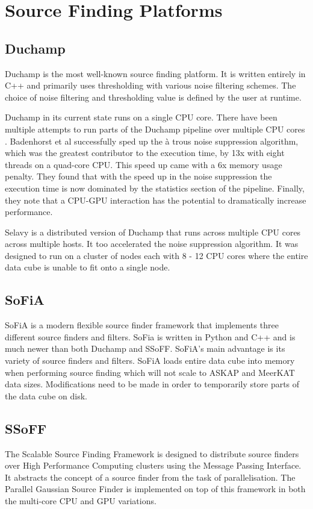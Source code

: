 \documentclass[prodmode,acmtecs]{acmsmall} \usepackage[ruled]{algorithm2e}
\begin{document}
\section{Source Finding Platforms}
    \subsection{Duchamp}
Duchamp is the most well-known source finding platform. It is written entirely in C++ and primarily uses
thresholding with various noise filtering schemes. The choice of noise filtering and thresholding
value is defined by the user at runtime.  
        \cite{whiting2012duchamp}

Duchamp in its current state runs on a single CPU core. There have been multiple attempts to run
parts of the Duchamp pipeline over multiple CPU cores \cite{scott} \cite{whiting2012source}. Badenhorst et al 
 successfully sped up the \`{a} trous noise suppression algorithm, which was the greatest contributor to the 
execution time, by 13x with eight threads on a quad-core CPU.
This speed up came with a 6x memory usage penalty. They found that with the speed up in the noise
suppression the execution time is now dominated by the statistics section of the pipeline. Finally,
they note that a CPU-GPU interaction has the potential to dramatically increase performance.

Selavy \cite{whiting2012source} is a distributed version of Duchamp that runs across multiple CPU
\cite{} cores across multiple hosts. It too accelerated the noise suppression algorithm. 
It was designed to run on a cluster of nodes each with 8 - 12
CPU cores where the entire data cube is unable to fit onto a single node. 


    \subsection{SoFiA}
    SoFiA is a modern flexible source finder framework that implements three different source finders
    and filters. SoFia is written in Python and C++ and is much newer than both Duchamp and SSoFF. 
    SoFiA's main advantage is its variety of source finders and filters.  
    SoFiA loads entire data cube into memory when performing source finding which will not scale to ASKAP
    and MeerKAT data sizes. Modifications need to be made in order to temporarily store parts of the data cube
    on disk.
        \cite{serra2015sofia}
        
     

        \subsection{SSoFF}
The Scalable Source Finding Framework  is designed to distribute source finders over High Performance
Computing clusters using the Message Passing Interface. It abstracts the concept of a source finder from
the task of parallelisation. The Parallel Gaussian Source Finder is implemented on top
of this framework in both the multi-core CPU and GPU variations.
\end{document}
